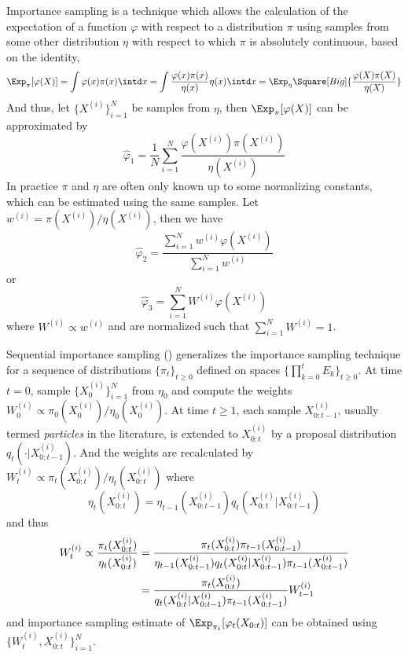 \documentclass[11pt,bib,mint,hyper,altcolor]{marticle}
\begin{document}
Importance sampling is a technique which allows the calculation of the
expectation of a function $\varphi$ with respect to a distribution $\pi$ using
samples from some other distribution $\eta$ with respect to which $\pi$ is
absolutely continuous, based on the identity,
\begin{equation}
  \Exp_{\pi}[\varphi(X)]
  = \int\varphi(x)\pi(x)\intd x
  = \int\frac{\varphi(x)\pi(x)}{\eta(x)}\eta(x)\intd x
  = \Exp_{\eta}\Square[Big]{\frac{\varphi(X)\pi(X)}{\eta(X)}}
\end{equation}
And thus, let $\{X^{(i)}\}_{i=1}^N$ be samples from $\eta$, then
$\Exp_{\pi}[\varphi(X)]$ can be approximated by
\begin{equation}
  \hat\varphi_1 =
  \frac{1}{N}\sum_{i=1}^N\frac{\varphi(X^{(i)})\pi(X^{(i)})}{\eta(X^{(i)})}
\end{equation}
In practice $\pi$ and $\eta$ are often only known up to some normalizing
constants, which can be estimated using the same samples. Let $w^{(i)} =
\pi(X^{(i)})/\eta(X^{(i)})$, then we have
\begin{equation}
  \hat\varphi_2 =
  \frac{\sum_{i=1}^Nw^{(i)}\varphi(X^{(i)})}{\sum_{i=1}^Nw^{(i)}}
\end{equation}
or
\begin{equation}
  \hat\varphi_3 = \sum_{i=1}^NW^{(i)}\varphi(X^{(i)})
\end{equation}
where $W^{(i)}\propto w^{(i)}$ and are normalized such that
$\sum_{i=1}^NW^{(i)} = 1$.

Sequential importance sampling (\sis) generalizes the importance sampling
technique for a sequence of distributions $\{\pi_t\}_{t\ge0}$ defined on spaces
$\{\prod_{k=0}^tE_k\}_{t\ge0}$. At time $t = 0$, sample $\{X_0^{(i)}\}_{i=1}^N$
from $\eta_0$ and compute the weights $W_0^{(i)} \propto
\pi_0(X_0^{(i)})/\eta_0(X_0^{(i)})$. At time $t\ge1$, each sample
$X_{0:t-1}^{(i)}$, usually termed \emph{particles} in the literature, is
extended to $X_{0:t}^{(i)}$ by a proposal distribution
$q_t(\cdot|X_{0:t-1}^{(i)})$. And the weights are recalculated by $W_t^{(i)}
\propto \pi_t(X_{0:t}^{(i)})/\eta_t(X_{0:t}^{(i)})$ where
\begin{equation}
  \eta_t(X_{0:t}^{(i)}) =
  \eta_{t-1}(X_{0:t-1}^{(i)})q_t(X_{0:t}^{(i)}|X_{0:t-1}^{(i)})
\end{equation}
and thus
\begin{align}
  W_t^{(i)} \propto \frac{\pi_t(X_{0:t}^{(i)})}{\eta_t(X_{0:t}^{(i)})}
  &= \frac{\pi_t(X_{0:t}^{(i)})\pi_{t-1}(X_{0:t-1}^{(i)})}
  {\eta_{t-1}(X_{0:t-1}^{(i)})q_t(X_{0:t}^{(i)}|X_{0:t-1}^{(i)})
    \pi_{t-1}(X_{0:t-1}^{(i)})} \notag\\
  &= \frac{\pi_t(X_{0:t}^{(i)})}
  {q_t(X_{0:t}^{(i)}|X_{0:t-1}^{(i)})\pi_{t-1}(X_{0:t-1}^{(i)})}W_{t-1}^{(i)}
  \label{eq:si}
\end{align}
and importance sampling estimate of $\Exp_{\pi_t}[\varphi_t(X_{0:t})]$ can be
obtained using $\{W_t^{(i)},X_{0:t}^{(i)}\}_{i=1}^N$.
\end{document}
